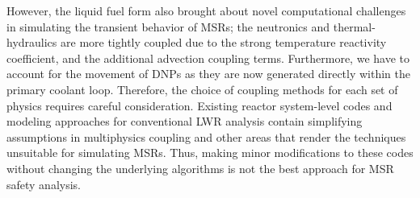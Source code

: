 However, the liquid fuel form also brought about novel computational
challenges in simulating the transient behavior of \glspl{MSR}; the
neutronics and thermal-hydraulics are more tightly coupled due to the strong
temperature reactivity coefficient, and the additional advection coupling
terms. Furthermore, we have to account for the movement of \glspl{DNP} as
they are now generated directly within the primary coolant loop. Therefore,
the choice of coupling methods for each set of physics requires careful
consideration. Existing reactor system-level codes and modeling approaches
for conventional \gls{LWR} analysis contain simplifying assumptions in
multiphysics coupling and other areas that render the techniques unsuitable
for simulating \glspl{MSR}. Thus, making minor modifications to these codes
without changing the underlying algorithms is not the best approach for
\gls{MSR} safety analysis.

